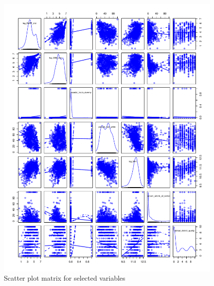 \documentclass[10pt, letterpaper]{amsart}
\begin{document}
\begin{figure}[!htbp]
  \caption{Scatter plot matrix for selected variables}
  \includegraphics[scale=0.6]{Scatter_plot_matrix_selected_variables}
\end{figure}
\end{document}
